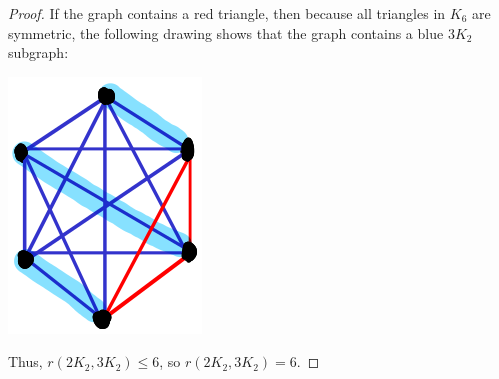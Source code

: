 \documentclass[12pt]{article}
\begin{document}
\begin{proof}
    If the graph contains a red triangle, then because all triangles in $K_6$ are symmetric, the following drawing shows that the graph contains a blue $3K_2$ subgraph:
    \begin{center} \includegraphics[scale=.5]{4.png} \end{center}
    Thus, $r(2K_2, 3K_2) \leq 6$, so $r(2K_2, 3K_2) = 6$.
\end{proof}
\end{document}

